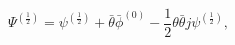 \begin{equation}
 \Psi^{(\frac{1}{2})}=\psi^{(\frac{1}{2})}
+\bar\theta\bar\phi^{(0)}
-\frac{1}{2}\theta\bar\theta j\psi^{(\frac{1}{2})},
\end{equation}

